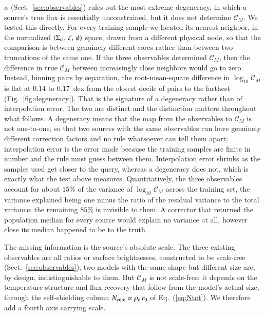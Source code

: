 \documentclass{aa}
\newcommand{\Scloud}{\Sigma_{\rm cl}}
\newcommand{\CM}{\mathcal{C}_{M}}
\begin{document}
$\phi$ (Sect.~\ref{sec:observables}) rules out the most extreme degeneracy,
in which a source's true flux is essentially unconstrained, but it does not
determine $\CM$. We tested this directly. For every training sample we
located its nearest neighbor, in the normalized
$(\Scloud,\,\zeta,\,\phi)$ space, drawn from a different physical
node, so that the comparison is between genuinely different cores rather
than between two truncations of the same one. If the three observables
determined $\CM$, then the difference in true $\CM$ between increasingly
close neighbors would go to zero. Instead, binning pairs by separation, the
root-mean-square difference in $\log_{10}\CM$ is flat at $0.14$ to
$0.17$~dex from the closest decile of pairs to the farthest
(Fig.~\ref{fig:degeneracy}). That is the signature of a degeneracy rather
than of interpolation error. The two are distinct and the distinction
matters throughout what follows. A degeneracy means that the map from the
observables to $\CM$ is not one-to-one, so that two sources with the same
observables can have genuinely different correction factors and no rule
whatsoever can tell them apart; interpolation error is the error made
because the training samples are finite in number and the rule must guess
between them. Interpolation error shrinks as the samples used get closer to
the query, whereas a degeneracy does not, which is exactly what the test
above measures. Quantitatively, the three observables account for about
$15\%$ of the variance of $\log_{10}\CM$ across the training set, the
variance explained being one minus the ratio of the residual variance to the
total variance; the remaining $85\%$ is invisible to them. A corrector that
returned the population median for every source would explain no variance at
all, however close its median happened to be to the truth.

The missing information is the source's absolute scale. The three existing
observables are all ratios or surface brightnesses, constructed to be
scale-free (Sect.~\ref{sec:observables}); two models with the same shape but
different size are, by design, indistinguishable to them. But $\CM$ is not
scale-free: it depends on the temperature structure and flux recovery that
follow from the model's actual size, through the self-shielding column
$N_{\rm core}\propto\rho_{\rm c}\,r_0$ of Eq.~(\ref{eq:Ntot}). We therefore
add a fourth axis carrying scale.
\end{document}
